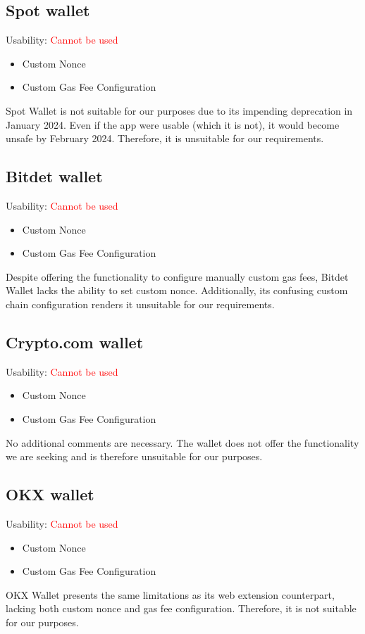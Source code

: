 \documentclass[fleqn,10pt]{olplainarticle}
\newcommand{\xmark}{\ding{55}}%
\begin{document}
\subsection{Spot wallet}
Usability: \textcolor{red}{Cannot be used}
\begin{itemize}[noitemsep, nolistsep]
	\item [\textcolor{red}{\xmark}] Custom Nonce
	\item [\textcolor{red}{\xmark}] Custom Gas Fee Configuration
\end{itemize}
Spot Wallet is not suitable for our purposes due to its impending deprecation in January 2024. Even if the app were usable (which it is not), it would become unsafe by February 2024. Therefore, it is unsuitable for our requirements.

\subsection{Bitdet wallet}
Usability: \textcolor{red}{Cannot be used}
\begin{itemize}[noitemsep, nolistsep]
	\item [\textcolor{red}{\xmark}] Custom Nonce
	\item [\textcolor{red}{\xmark}]  Custom Gas Fee Configuration
\end{itemize}
Despite offering the functionality to configure manually custom gas fees, Bitdet Wallet lacks the ability to set custom nonce. Additionally, its confusing custom chain configuration renders it unsuitable for our requirements.

\subsection{Crypto.com wallet}
Usability: \textcolor{red}{Cannot be used}
\begin{itemize}[noitemsep, nolistsep]
	\item [\textcolor{red}{\xmark}] Custom Nonce
	\item [\textcolor{red}{\xmark}] Custom Gas Fee Configuration
\end{itemize}
No additional comments are necessary. The wallet does not offer the functionality we are seeking and is therefore unsuitable for our purposes.

\subsection{OKX wallet}
Usability: \textcolor{red}{Cannot be used}
\begin{itemize}[noitemsep, nolistsep]
	\item [\textcolor{red}{\xmark}] Custom Nonce
	\item [\textcolor{red}{\xmark}] Custom Gas Fee Configuration
\end{itemize}
OKX Wallet presents the same limitations as its web extension counterpart, lacking both custom nonce and gas fee configuration. Therefore, it is not suitable for our purposes.
\end{document}
